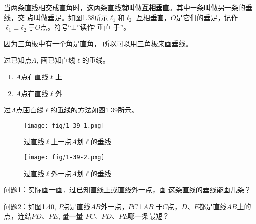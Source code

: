 当两条直线相交成直角时，这两条直线就叫做\textbf{互相垂直}。其中一条叫做另一条的垂线，交
点叫做垂足。如图1.38所示$\ell_1$和$\ell_2$
互相垂直，$O$是它们的垂足，记作
$\ell_1\bot \ell_2$于$O$点。符号“$\bot$”读作“垂直
于”。

\begin{figure}[htp]
	\centering
{}
	\caption{}
\end{figure}


因为三角板中有一个角是直角，
所以可以用三角板来画垂线。

\begin{example}
	过已知点$A$, 画已知直线$\ell$的垂线。
	
\end{example}

\begin{solution}
\begin{enumerate}
	\item $A$点在直线$\ell$上
	\item $A$点在直线$\ell$外
\end{enumerate}
过$A$点画直线$\ell$的垂线的方法如图1.39所示。

\begin{figure}[htp]\centering
	\begin{minipage}[t]{0.48\textwidth}
	\centering
\texttt{[image: fig/1-39-1.png]}
	\caption*{过直线$\ell$上一点$A$划$\ell$的垂线}
	\end{minipage}
	\begin{minipage}[t]{0.48\textwidth}
	\centering
\texttt{[image: fig/1-39-2.png]}
	\caption*{过直线$\ell$外一点$A$划$\ell$的垂线}
	\end{minipage}
	\caption{}
	\end{figure}
\end{solution}

问题1：实际画一画，过已知直线上或直线外一点，画
这条直线的垂线能画几条？

问题2：如图1.40, $P$点是直线$AB$外一点，$PC\bot AB$
于$C$点，$D$、$E$都是直线$AB$上的点，连结$\overline{PD}$、$\overline{PE}$, 量一量
$\overline{PC}$、$\overline{PD}$、$\overline{PE}$哪一条最短？

